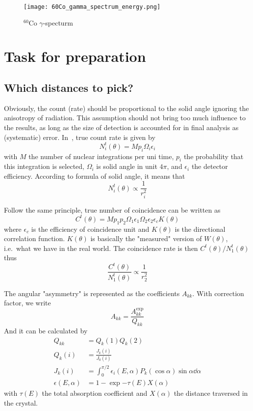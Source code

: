 \begin{figure}[ht]
   \centering
   \texttt{[image: 60Co\_gamma\_spectrum\_energy.png]}
   \caption{${}^{60}\text{Co}$ $\gamma$-specturm~\cite{CoSpec}}%
   \label{fig:CoSpec}
\end{figure}

\section{Task for preparation}\label{sec:task}
\subsection{Which distances to pick?}
Obviously, the count (rate) should be proportional to the solid angle ignoring the anisotropy of radiation. This assumption should not bring too much influence to the results, as long as the size of detection is accounted for in final analysis as (systematic) error. In~\cite{siegbahn}, true count rate is given by
\begin{equation}
   N^t_i (\theta) = M p_i \Omega_i \epsilon_i
\end{equation}
with $M$ the number of nuclear integrations per uni time, $p_i$ the probability that this integration is selected, $\Omega_i$ is solid angle in unit $4\pi$, and $\epsilon_i$ the detector efficiency. According to formula of solid angle, it means that
\begin{equation}
   N^t_i (\theta) \propto \frac{1}{r_i^2}
\end{equation}

Follow the same principle, true number of coincidence can be written as~\cite{siegbahn}
\begin{equation}
   C^t(\theta) = M p_1 p_2 \Omega_1 \epsilon_1 \Omega_2 \epsilon_2 \epsilon_c K(\theta)
\end{equation}
where $\epsilon_c$ is the efficiency of coincidence unit and $K(\theta)$ is the directional correlation function. $K(\theta)$ is basically the "measured" version of $W(\theta)$, i.e.~what we have in the real world. 
The coincidence rate is then $C^t(\theta)/ N_1^t(\theta)$ thus 
\begin{equation}
   \frac{C^t(\theta)}{N_1^t(\theta)} \propto \frac{1}{r_2^2}
\end{equation}

The angular "asymmetry" is represented as the coefficients $A_{kk}$. With correction factor, we write
\begin{equation}
   A_{kk} = \frac{A_{kk}^\text{exp}}{Q_{kk}}
\end{equation}
And it can be calculated by~\cite{siegbahn}
\begin{align}
   Q_{kk} &= Q_k(1) Q_k(2) \\
   Q_k(i) &= \frac{J_k(i)}{J_0(i)} \\
   J_k(i) &= \int_0^{\pi/2} \epsilon_i (E,\alpha) P_k (\cos\alpha) \sin \alpha \dd{\alpha} \\
   \epsilon(E,\alpha) &= 1 - \exp{- \tau (E) X(\alpha)}
\end{align}
with $\tau (E)$ the total absorption coefficient and $X(\alpha)$ the distance traversed in the crystal.

